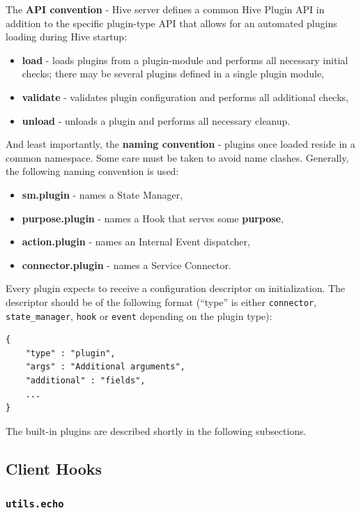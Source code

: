 \documentclass[a4paper]{article}
\begin{document}
\noindent
The \textbf{API convention} - Hive server defines a common Hive Plugin API in addition to the specific plugin-type API that allows for an automated plugins loading during Hive startup:


\begin{itemize}
\item \textbf{load} - loads plugins from a plugin-module and performs all necessary initial checks; there may be several plugins defined in a single plugin module,
\item \textbf{validate} - validates plugin configuration and performs all additional checks,
\item \textbf{unload} - unloads a plugin and performs all necessary cleanup.
\end{itemize}

\noindent
And least importantly, the \textbf{naming convention} - plugins once loaded reside in a common namespace. Some care must be taken to avoid name clashes. Generally, the following naming convention is used:


\begin{itemize}
\item \textbf{sm.plugin} - names a State Manager,
\item \textbf{purpose.plugin} - names a Hook that serves some \textbf{purpose},
\item \textbf{action.plugin} - names an Internal Event dispatcher,
\item \textbf{connector.plugin} - names a Service Connector.
\end{itemize}

\noindent
Every plugin expects to receive a configuration descriptor on initialization. The descriptor should be of the following format (``type'' is either \texttt{connector}, \texttt{state\_manager}, \texttt{hook} or \texttt{event} depending on the plugin type):


\begin{verbatim}
{
    "type" : "plugin",
    "args" : "Additional arguments",
    "additional" : "fields",
    ...
}
\end{verbatim}




\noindent
The built-in plugins are described shortly in the following subsections.
\subsection{Client Hooks}
\label{sec-8-2}
\label{ref-hooks}
\subsubsection{\texttt{utils.echo}}
\label{sec-8-2-1}
\end{document}
